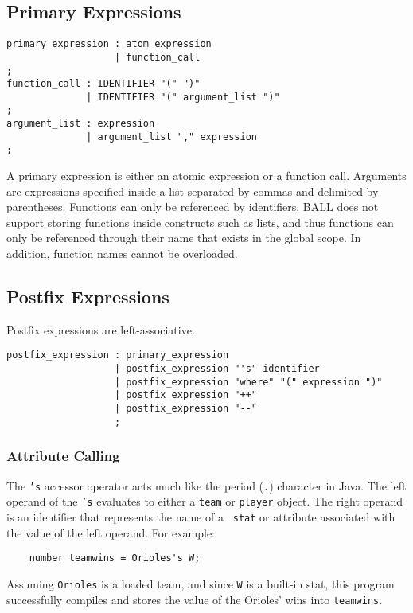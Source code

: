 \subsection{Primary Expressions}
\begin{verbatim}
primary_expression : atom_expression
                   | function_call
;
function_call : IDENTIFIER "(" ")"
              | IDENTIFIER "(" argument_list ")"
;
argument_list : expression
              | argument_list "," expression
;
\end{verbatim} 

A primary expression is either an atomic expression or a function
call. Arguments are expressions specified inside a list separated by
commas and delimited by parentheses.  Functions can only be referenced
by identifiers. BALL does not support storing functions inside
constructs such as lists, and thus functions can only be referenced
through their name that exists in the global scope. In addition,
function names cannot be overloaded.

\subsection{Postfix Expressions}
Postfix expressions are left-associative.
\begin{verbatim}
postfix_expression : primary_expression
                   | postfix_expression "'s" identifier
                   | postfix_expression "where" "(" expression ")"
                   | postfix_expression "++"
                   | postfix_expression "--"
                   ;
\end{verbatim}

\subsubsection{Attribute Calling}
The \texttt{'s} accessor operator acts much like the period
(\texttt{.}) character in Java. The left operand of the \texttt{'s}
evaluates to either a \texttt{team} or \texttt{player} object. The
right operand is an identifier that represents the name of a {\tt
  stat} or attribute associated with the value of the left
operand. For example:
\begin{verbatim}
    number teamwins = Orioles's W;
\end{verbatim}
Assuming \texttt{Orioles} is a loaded team, and since \texttt{W} is a
built-in stat, this program successfully compiles and stores the value
of the Orioles' wins into \texttt{teamwins}.

